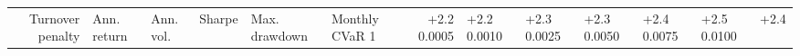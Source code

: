\begin{tabular}{rllrllrl}
\toprule
Turnover penalty & Ann. return & Ann. vol. & Sharpe & Max. drawdown & Monthly CVaR 1%
 & +2.2%
0.0005 & +2.2%
0.0010 & +2.3%
0.0025 & +2.3%
0.0050 & +2.4%
0.0075 & +2.5%
0.0100 & +2.4%
\bottomrule
\end{tabular}
